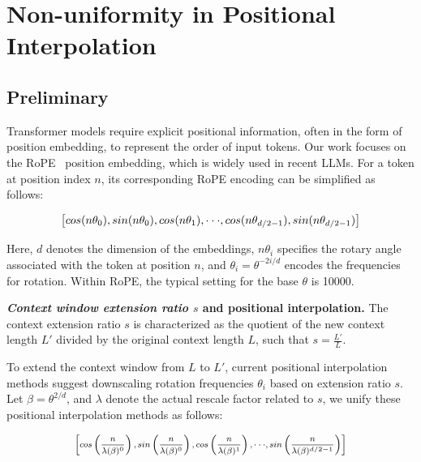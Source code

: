 \section{Non-uniformity in Positional Interpolation}
\label{sec:analysis}

\subsection{Preliminary}

Transformer models require explicit positional information, often in the form of position embedding, to represent the order of input tokens. Our work focuses on the RoPE~\cite{rope} position embedding, which is widely used in recent  LLMs. For a token at position index $n$, its corresponding RoPE encoding can be simplified as follows:

\begin{equation}
		\fontsize{7.8}{7.8} \selectfont
	\label{eq:rope}
	\left[ cos(n\theta_0), sin(n\theta_0), cos(n\theta_1), \cdot\cdot\cdot, cos(n\theta_{d/2-1}), sin(n\theta_{d/2-1}) \right]   
\end{equation}

Here, $d$ denotes the dimension of the embeddings, $n\theta_i$ specifies the rotary angle associated with the token at position $n$, and $\theta_i=\theta^{-2i/d}$ encodes the frequencies for rotation. Within RoPE, the typical setting for the base $\theta$ is 10000.

\textbf{\emph{Context window extension ratio $s$} and positional interpolation.} The context extension ratio $s$ is characterized as the quotient of the new context length $L'$ divided by the original context length $L$, such that $s=\frac{L'}{L}$.

To extend the context window from $L$ to $L'$, current positional interpolation methods suggest downscaling rotation frequencies $\theta_i$ based on extension ratio $s$. Let $\beta=\theta^{2/d}$, and $\lambda$ denote the actual rescale factor related to $s$, we   unify these positional interpolation methods as follows:

\begin{equation}	
	\fontsize{7.5}{7.5} \selectfont
	\label{eq:unified_rope}
	\begin{aligned}
		\left[cos\left(\frac{n}{\lambda(\beta)^0}\right), sin \left(\frac{n}{\lambda(\beta)^0}\right), cos\left(\frac{n}{\lambda(\beta)^1}\right), \cdot\cdot\cdot,  sin \left(\frac{n}{\lambda(\beta)^{d/2-1}}\right) \right]   
	\end{aligned}
\end{equation}


